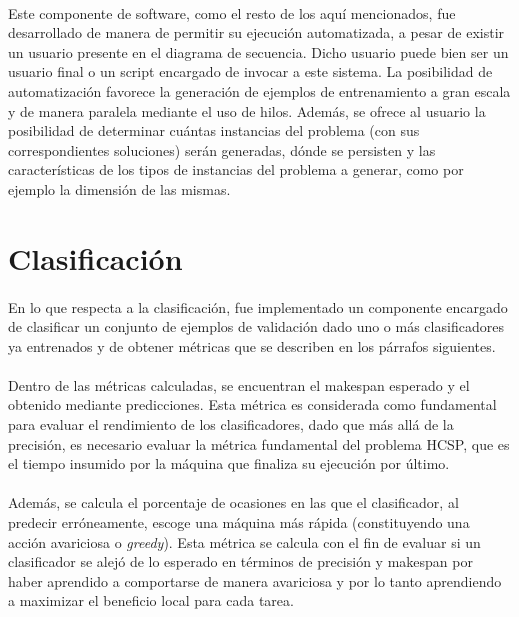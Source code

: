 \paragraph{} Este componente de software, como el resto de los aquí mencionados, fue desarrollado de manera de permitir su ejecución automatizada, a pesar de existir un usuario presente en el diagrama de secuencia. Dicho usuario puede bien ser un usuario final o un script encargado de invocar a este sistema. La posibilidad de automatización favorece la generación de ejemplos de entrenamiento a gran escala y de manera paralela mediante el uso de hilos. Además, se ofrece al usuario la posibilidad de determinar cuántas instancias del problema (con sus correspondientes soluciones) serán generadas, dónde se persisten y las características de los tipos de instancias del problema a generar, como por ejemplo la dimensión de las mismas.




\section{Clasificación} \label{chapter-implementacion:clasificacion}

\paragraph{} En lo que respecta a la clasificación, fue implementado un componente encargado de clasificar un conjunto de ejemplos de validación dado uno o más clasificadores ya entrenados y de obtener métricas que se describen en los párrafos siguientes.

\paragraph{} Dentro de las métricas calculadas, se encuentran el makespan esperado y el obtenido mediante predicciones. Esta métrica es considerada como fundamental para evaluar el rendimiento de los clasificadores, dado que más allá de la precisión, es necesario evaluar la métrica fundamental del problema HCSP, que es el tiempo insumido por la máquina que finaliza su ejecución por último.

\paragraph{} Además, se calcula el porcentaje de ocasiones en las que el clasificador, al predecir erróneamente, escoge una máquina más rápida (constituyendo una acción avariciosa o \textit{greedy}). Esta métrica se calcula con el fin de evaluar si un clasificador se alejó de lo esperado en términos de precisión y makespan por haber aprendido a comportarse de manera avariciosa y por lo tanto aprendiendo a maximizar el beneficio local para cada tarea.
